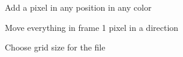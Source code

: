 \documentclass[11pt]{article} %
\begin{document}
\begin{figure}[H]
	\centering
	\caption{Add a pixel in any position in any color}
	\label{fig:UC5}
\end{figure}

\begin{figure}[H]
	\centering
	\caption{Move everything in frame 1 pixel in a direction}
	\label{fig:UC6}
\end{figure}

\begin{figure}[H]
	\centering
	\caption{Choose grid size for the file}
	\label{fig:UC7}
\end{figure}
\end{document}
